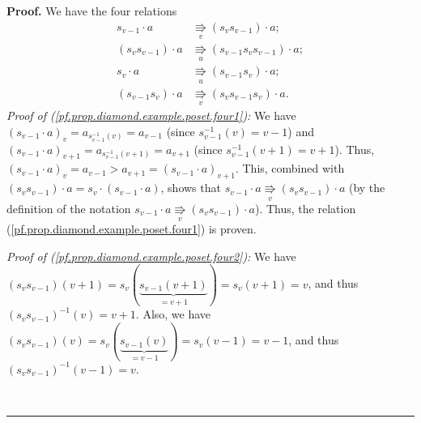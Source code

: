 \documentclass[numbers=enddot,12pt,final,onecolumn,notitlepage]{scrartcl}%
\theoremstyle{definition}
\newenvironment{proof}[1][Proof]{\noindent\textbf{#1.} }{\ \rule{0.5em}{0.5em}}
\newenvironment{verlong}{}{}
\begin{document}
\begin{proof}
\begin{verlong}
We have the four relations%
\begin{align}
s_{v-1}\cdot a  &  \underset{v}{\Rrightarrow}\left(  s_{v}s_{v-1}\right)
\cdot a;\label{pf.prop.diamond.example.poset.four1}\\
\left(  s_{v}s_{v-1}\right)  \cdot a  &  \underset{u}{\Rrightarrow}\left(
s_{v-1}s_{v}s_{v-1}\right)  \cdot
a;\label{pf.prop.diamond.example.poset.four2}\\
s_{v}\cdot a  &  \underset{u}{\Rrightarrow}\left(  s_{v-1}s_{v}\right)  \cdot
a;\label{pf.prop.diamond.example.poset.four3}\\
\left(  s_{v-1}s_{v}\right)  \cdot a  &  \underset{v}{\Rrightarrow}\left(
s_{v}s_{v-1}s_{v}\right)  \cdot a. \label{pf.prop.diamond.example.poset.four4}%
\end{align}
\textit{Proof of (\ref{pf.prop.diamond.example.poset.four1}):} We have
$\left(  s_{v-1}\cdot a\right)  _{v}=a_{s_{v-1}^{-1}\left(  v\right)
}=a_{v-1}$ (since $s_{v-1}^{-1}\left(  v\right)  =v-1$) and $\left(
s_{v-1}\cdot a\right)  _{v+1}=a_{s_{v-1}^{-1}\left(  v+1\right)  }=a_{v+1}$
(since $s_{v-1}^{-1}\left(  v+1\right)  =v+1$). Thus, $\left(  s_{v-1}\cdot
a\right)  _{v}=a_{v-1}>a_{v+1}=\left(  s_{v-1}\cdot a\right)  _{v+1}$. This,
combined with $\left(  s_{v}s_{v-1}\right)  \cdot a=s_{v}\cdot\left(
s_{v-1}\cdot a\right)  $, shows that $s_{v-1}\cdot a\underset{v}{\Rrightarrow
}\left(  s_{v}s_{v-1}\right)  \cdot a$ (by the definition of the notation
$s_{v-1}\cdot a\underset{v}{\Rrightarrow}\left(  s_{v}s_{v-1}\right)  \cdot
a$). Thus, the relation (\ref{pf.prop.diamond.example.poset.four1}) is proven.

\textit{Proof of (\ref{pf.prop.diamond.example.poset.four2}):} We have
$\left(  s_{v}s_{v-1}\right)  \left(  v+1\right)  =s_{v}\left(
\underbrace{s_{v-1}\left(  v+1\right)  }_{=v+1}\right)  =s_{v}\left(
v+1\right)  =v$, and thus $\left(  s_{v}s_{v-1}\right)  ^{-1}\left(  v\right)
=v+1$. Also, we have $\left(  s_{v}s_{v-1}\right)  \left(  v\right)
=s_{v}\left(  \underbrace{s_{v-1}\left(  v\right)  }_{=v-1}\right)
=s_{v}\left(  v-1\right)  =v-1$, and thus $\left(  s_{v}s_{v-1}\right)
^{-1}\left(  v-1\right)  =v$.


\end{verlong}
\end{proof}
\end{document}
